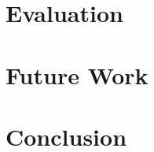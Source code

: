 \documentclass[10pt,fleqn,a4paper]{article}
\begin{document}
\begin{twocolumn}
\section{Evaluation}


\section{Future Work}


\section{Conclusion}





\end{twocolumn}
\end{document}
